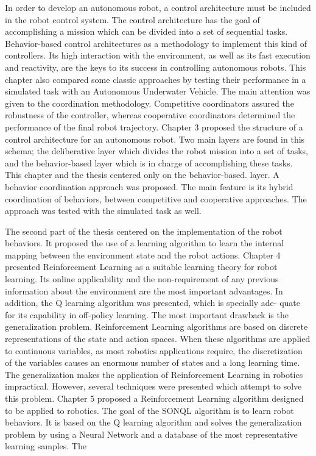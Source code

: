 In order to develop an autonomous robot, a control architecture must be included in the robot control system. The control architecture has the goal of accomplishing a mission which can be divided into a set of sequential tasks.  Behavior-based control architectures as a methodology to implement this kind of controllers. Its high interaction with the environment, as well as its fast execution and reactivity, are the keys to its success in controlling autonomous robots. This chapter also compared some classic approaches by testing their performance in a simulated task with an Autonomous Underwater Vehicle. The main attention was given to the coordination methodology. Competitive coordinators assured the robustness of the controller, whereas cooperative coordinators determined the performance of the final robot trajectory. Chapter 3 proposed the structure of a control architecture for an autonomous robot. Two main layers are found in this schema; the deliberative layer which divides the robot mission into a set of tasks, and the behavior-based layer which is in charge of accomplishing these tasks. This chapter and the thesis centered only on the behavior-based. layer. A behavior coordination approach was proposed. The main feature is its hybrid coordination of behaviors, between competitive and cooperative approaches. The approach was tested with the simulated task as well.


The second part of the thesis centered on the implementation of the robot
behaviors. It proposed the use of a learning algorithm to learn the internal mapping between the environment state and the robot actions. Chapter 4 presented Reinforcement Learning as a suitable learning theory for robot learning. Its online applicability and the non-requirement of any previous information about the environment are the most important advantages. In addition, the Q learning algorithm was presented, which is specially ade- quate for its capability in off-policy learning. The most important drawback is the generalization problem. Reinforcement Learning algorithms are based on discrete representations of the state and action spaces. When these algorithms are applied to continuous variables, as most robotics applications require, the discretization of the variables causes an enormous number of states and a long learning time. The generalization makes the application of Reinforcement Learning in robotics impractical. However, several techniques were presented which attempt to solve this problem. Chapter 5 proposed a Reinforcement Learning algorithm designed to be applied to robotics. The goal of the SONQL algorithm is to learn robot behaviors. It is based on the Q learning algorithm and solves the generalization problem by using a Neural Network and a database of the most representative learning samples.
The


